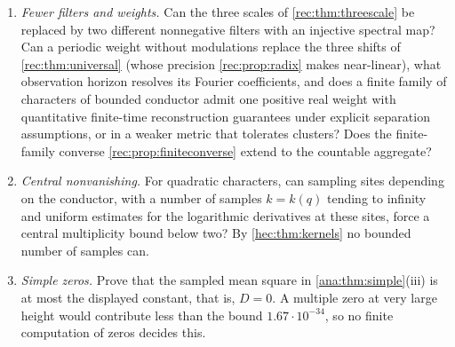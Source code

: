 \begin{enumerate}
observation errors, and are there finite bounds like \cref{rec:thm:onegapbounds} for a complex
character, whose two signs of ordinates carry different masses?
\item \emph{Fewer filters and weights.} Can the three scales of \cref{rec:thm:threescale} be replaced by
two different nonnegative filters with an injective spectral map? Can a periodic weight without
modulations replace the three shifts of \cref{rec:thm:universal} (whose precision \cref{rec:prop:radix} makes
near-linear), what observation horizon resolves its Fourier coefficients, and does a finite family of characters of bounded conductor admit one
positive real weight with quantitative finite-time reconstruction guarantees under explicit separation
assumptions, or in a weaker metric that tolerates clusters? Does the finite-family converse
\cref{rec:prop:finiteconverse} extend to the countable aggregate?
\item \emph{Central nonvanishing.} For quadratic characters, can sampling sites depending on the
conductor, with a number of samples $k=k(q)$ tending to infinity and uniform estimates for the logarithmic
derivatives at these sites, force a central multiplicity bound below two? By \cref{hec:thm:kernels} no
bounded number of samples can.
\item\label{ana:q:simple} \emph{Simple zeros.} Prove that the sampled mean square in \cref{ana:thm:simple}(iii) is at most the displayed
constant, that is, $D=0$. A multiple zero at very large height would contribute less than the
bound $1.67\cdot10^{-34}$, so no finite computation of zeros decides this.
\end{enumerate}
